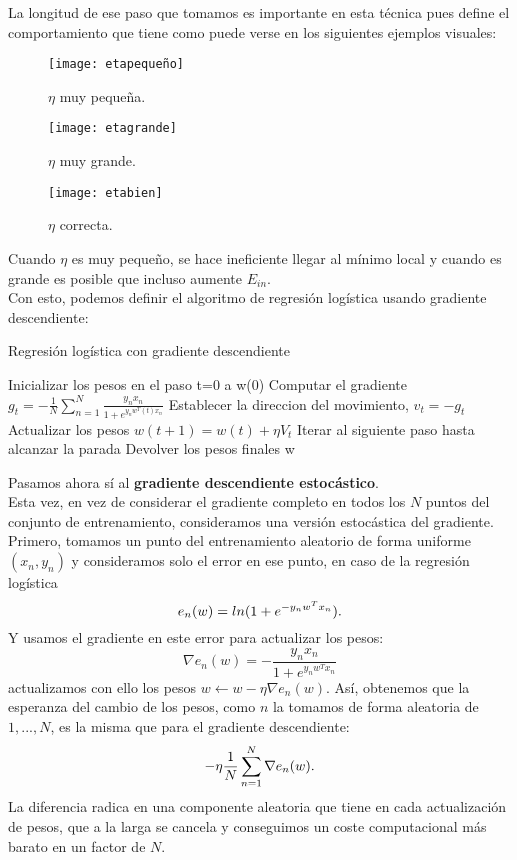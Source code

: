 La longitud de ese paso que tomamos es importante en esta técnica pues define el comportamiento que tiene como puede verse en los siguientes ejemplos visuales:
\begin{figure}[H]
  \texttt{[image: etapequeño]}
  \caption{$\eta$ muy pequeña.} \label{fig:etapequeño}
\endminipage\hfill
{}
  \texttt{[image: etagrande]}
  \caption{$\eta$ muy grande.} \label{fig:etagrande}
\endminipage\hfill
{}%
  \texttt{[image: etabien]}
  \caption{$\eta$ correcta.} \label{fig:etabien}
\endminipage
\end{figure}
Cuando $\eta$ es muy pequeño, se hace ineficiente llegar al mínimo local y cuando es grande es posible que incluso aumente $E_{in}$.\\
Con esto, podemos definir el algoritmo de regresión logística usando gradiente descendiente:
\begin{algorithm}
\caption{Regresión logística con gradiente descendiente}
\begin{algorithmic}[1]
\State Inicializar los pesos en el paso t=0 a w(0)
    \State Computar el gradiente $ g_{t}=-\frac{1}{N}\sum_{n=1}^{N} \frac{y_{n}x_{n}}{1+e^{y_{n}w^{T}(t)x_{n}}} $
    \State Establecer la direccion del movimiento, $v_{t}=-g_{t}$
    \State Actualizar los pesos $w(t+1)=w(t)+\eta V_{t}$
    \State Iterar al siguiente paso hasta alcanzar la parada
\EndFor
\State Devolver los pesos finales w
\end{algorithmic}
\end{algorithm}
Pasamos ahora sí al \textbf{gradiente descendiente estocástico}.\\
Esta vez, en vez de considerar el gradiente completo en todos los $N$ puntos del conjunto de entrenamiento, consideramos una versión estocástica del gradiente. Primero, tomamos un punto del entrenamiento aleatorio de forma uniforme $(x_{n},y_{n})$ y consideramos solo el error en ese punto, en caso de la regresión logística
\[e_{n}(w)=ln(1+e^{-y_{n}w^{T}x_{n}}) \textnormal{.}\]
Y usamos el gradiente en este error para actualizar los pesos:
\[ \nabla e_{n}(w) = -\frac{y_{n}x_{n}}{1+e^{y_{n}w^{T}x_{n}}} \]
actualizamos con ello los pesos $w \leftarrow w -\eta \nabla e_{n}(w)$. Así, obtenemos que la esperanza del cambio de los pesos, como $n$ la tomamos de forma aleatoria de {$1,...,N$}, es la misma que para el gradiente descendiente:
\[ -\eta \frac{1}{N} \sum_{n=1}^{N} \nabla e_{n}(w) \textnormal{.} \]
La diferencia radica en una componente aleatoria que tiene en cada actualización de pesos, que a la larga se cancela y conseguimos un coste computacional más barato en un factor de $N$. \cite{abu2012learning}\\
